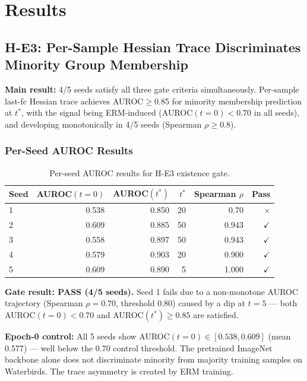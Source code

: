 \section{Results}
\label{sec:results}

\subsection{H-E3: Per-Sample Hessian Trace Discriminates Minority Group Membership}

\textbf{Main result:} 4/5 seeds satisfy all three gate criteria simultaneously. Per-sample last-fc Hessian trace achieves AUROC$\geq$0.85 for minority membership prediction at $t^*$, with the signal being ERM-induced (AUROC$(t{=}0)<0.70$ in all seeds), and developing monotonically in 4/5 seeds (Spearman $\rho\geq$0.8).

\subsubsection*{Per-Seed AUROC Results}

\begin{table}[h]
\centering
\caption{Per-seed AUROC results for H-E3 existence gate.}
\label{tab:auroc}
\begin{tabular}{@{}lrrrrr@{}}
\toprule
Seed & AUROC$(t{=}0)$ & AUROC$(t^*)$ & $t^*$ & Spearman $\rho$ & Pass \\
\midrule
1 & 0.538 & 0.850 & 20 & 0.70 & $\times$ \\
2 & 0.609 & 0.885 & 50 & 0.943 & $\checkmark$ \\
3 & 0.558 & 0.897 & 50 & 0.943 & $\checkmark$ \\
4 & 0.579 & 0.903 & 20 & 0.900 & $\checkmark$ \\
5 & 0.609 & 0.890 & 5  & 1.000 & $\checkmark$ \\
\bottomrule
\end{tabular}
\end{table}

\textbf{Gate result: PASS (4/5 seeds).} Seed 1 fails due to a non-monotone AUROC trajectory (Spearman $\rho{=}0.70$, threshold 0.80) caused by a dip at $t{=}5$ --- both AUROC$(t{=}0)<0.70$ and AUROC$(t^*)\geq 0.85$ are satisfied.

\textbf{Epoch-0 control:} All 5 seeds show AUROC$(t{=}0)\in[0.538, 0.609]$ (mean 0.577) --- well below the 0.70 control threshold. The pretrained ImageNet backbone alone does not discriminate minority from majority training samples on Waterbirds. The trace asymmetry is created by ERM training.

